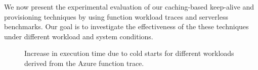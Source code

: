 \label{sec:eval}
\vspace*{-5pt}

We now present the experimental evaluation of our caching-based keep-alive and provisioning techniques by using function workload traces and serverless benchmarks.
Our goal is to investigate the effectiveness of the these techniques under different workload and system conditions. 



\begin{figure}
  \centering
    \vspace*{\myfigspace}
  \hfill 
\hfill 
  \vspace*{\myfigspace}
\caption{Increase in execution time due to cold starts for different workloads derived from the Azure function trace.}
\label{fig:exec-overheads-all}
  \vspace*{\myfigspace}
\end{figure}


